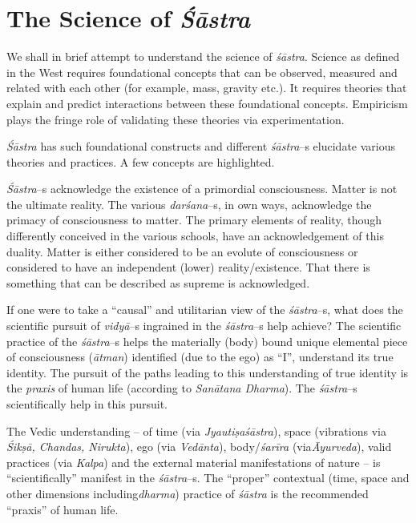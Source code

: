 \section*{The Science of \textit{Śāstra}}

We shall in brief attempt to understand the science of \textit{śāstra}. Science as defined in the West requires foundational concepts that can be observed, measured and related with each other (for example, mass, gravity etc.). It requires theories that explain and predict interactions between these foundational concepts. Empiricism plays the fringe role of validating these theories via experimentation.

\textit{Śāstra} has such foundational constructs and different \textit{śāstra}–s elucidate various theories and practices. A few concepts are highlighted.

\textit{Śāstra}–s acknowledge the existence of a primordial consciousness. Matter is not the ultimate reality. The various \textit{darśana}–s, in own ways, acknowledge the primacy of consciousness to matter. The primary elements of reality, though differently conceived in the various schools, have an acknowledgement of this duality. Matter is either considered to be an evolute of consciousness or considered to have an independent (lower) reality/existence. That there is something that can be described as supreme is acknowledged.

If one were to take a “causal” and utilitarian view of the \textit{śāstra}–s, what does the scientific pursuit of \textit{vidyā}–s ingrained in the \textit{śāstra}–s help achieve? The scientific practice of the \textit{śāstra}–s helps the materially (body) bound unique elemental piece of consciousness (\textit{ātman}) identified (due to the ego) as “I”, understand its true identity. The pursuit of the paths leading to this understanding of true identity is the \textit{praxis} of human life (according to \textit{Sanātana Dharma}). The \textit{śāstra}–s scientifically help in this pursuit. 

The Vedic understanding – of time (via \textit{Jyautiṣaśāstra}), space (vibrations via \textit{Śikṣā, Chandas, Nirukta}), ego (via \textit{Vedānta}), body/\textit{śarīra} (via\break \textit{Āyurveda}), valid practices (via \textit{Kalpa}) and the external material manifestations of nature – is “scientifically” manifest in the \textit{śāstra}–s. The “proper” contextual (time, space and other dimensions including\break \textit{dharma}) practice of \textit{śāstra} is the recommended “praxis” of human life.

